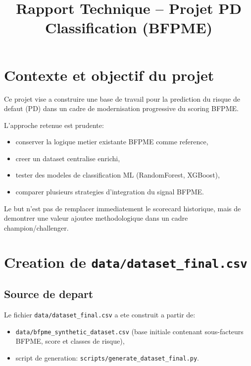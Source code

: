 \documentclass[11pt,a4paper]{article}
\title{Rapport Technique -- Projet PD Classification (BFPME)}
\author{}
\date{}
\begin{document}
\maketitle

\renewcommand{\contentsname}{Sommaire}
\setcounter{tocdepth}{2}
\tableofcontents
\newpage

\section{Contexte et objectif du projet}

Ce projet vise a construire une base de travail pour la prediction du risque de defaut (PD) dans un cadre de modernisation progressive du scoring BFPME.

L'approche retenue est prudente:
\begin{itemize}[leftmargin=1.2cm]
  \item conserver la logique metier existante BFPME comme reference,
  \item creer un dataset centralise enrichi,
  \item tester des modeles de classification ML (RandomForest, XGBoost),
  \item comparer plusieurs strategies d'integration du signal BFPME.
\end{itemize}

Le but n'est pas de remplacer immediatement le scorecard historique, mais de demontrer une valeur ajoutee methodologique dans un cadre champion/challenger.

\section{Creation de \texttt{data/dataset\_final.csv}}

\subsection{Source de depart}

Le fichier \texttt{data/dataset\_final.csv} a ete construit a partir de:
\begin{itemize}[leftmargin=1.2cm]
  \item \texttt{data/bfpme\_synthetic\_dataset.csv} (base initiale contenant sous-facteurs BFPME, score et classes de risque),
  \item script de generation: \texttt{scripts/generate\_dataset\_final.py}.
\end{itemize}
\end{document}
